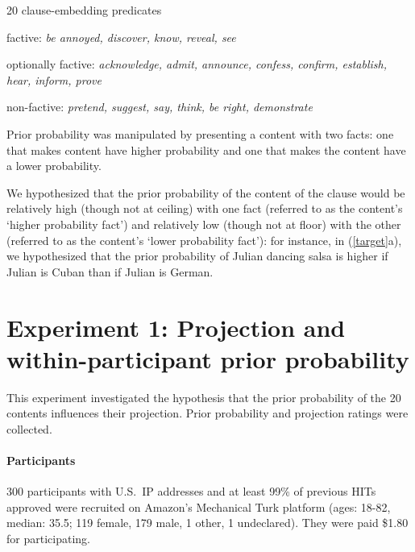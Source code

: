 \documentclass[11pt,fleqn]{article}
\newcommand{\6}{\mbox{$[\hspace*{-.6mm}[$}}
\newcommand{\9}{\mbox{$]\hspace*{-.6mm}]$}}
\begin{document}
\begin{exe}
\ex\label{pred} 20 clause-embedding predicates 

\begin{xlist}

\ex factive: {\em be annoyed, discover, know, reveal, see}

\ex optionally factive: {\em acknowledge, admit, announce, confess, confirm, establish, hear, inform, prove}

\ex non-factive:  {\em pretend, suggest, say, think, be right, demonstrate}

\end{xlist}

\end{exe}

Prior probability was manipulated by presenting a content with two facts: one that makes content have higher probability and one that makes the content have a lower probability.

We hypothesized that the prior probability of the content of the clause would be relatively high (though not at ceiling) with one fact (referred to as the content's `higher probability fact') and relatively low (though not at floor) with the other (referred to as the content's `lower probability fact'): for instance, in (\ref{target}a), we hypothesized that the prior probability of Julian dancing salsa is higher if Julian is Cuban than if Julian is German.

\newpage

\section{Experiment 1: Projection and within-participant prior probability}

This experiment investigated the hypothesis that the prior probability of the 20 contents influences their projection. Prior probability and projection ratings were collected. 

\paragraph{Participants} 300 participants with U.S.\ IP addresses and at least 99\% of previous HITs approved were recruited on Amazon's Mechanical Turk platform (ages: 18-82, median: 35.5; 119 female, 179 male, 1 other, 1 undeclared). They were paid \$1.80 for participating.
\end{document}
